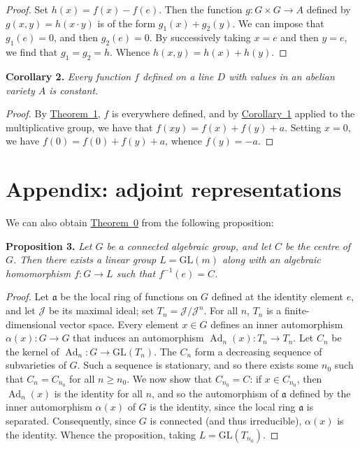 \documentclass{article}
\newenvironment{itenv}[1]
  {\phantomsection\par\medskip\noindent\textbf{#1.}\itshape}
  {\medskip}
\renewcommand{\geq}{\geqslant}
\newcommand{\scr}[1]{{\mathscr{#1}}}
\newcommand{\fk}[1]{{\mathfrak{#1}}}
\newcommand{\oldpage}[1]{\marginpar{\footnotesize$\Big\vert$ \textit{p.~#1}}}
\begin{document}
\begin{proof}
  Set $h(x)=f(x)-f(e)$.
  Then the function $g\colon G\times G\to A$ defined by $g(x,y)=h(x\cdot y)$ is of the form $g_1(x)+g_2(y)$.
  We can impose that $g_1(e)=0$, and then $g_2(e)=0$.
  By successively taking $x=e$ and then $y=e$, we find that $g_1=g_2=h$.
  Whence $h(x,y)=h(x)+h(y)$.
\end{proof}

\begin{itenv}{Corollary 2}
\label{corollary2}
  Every function $f$ defined on a line $D$ with values in an abelian variety $A$ is constant.
\end{itenv}

\oldpage{9-06}
\begin{proof}
  By \hyperref[theorem1]{Theorem~1}, $f$ is everywhere defined, and by \hyperref[corollary1]{Corollary~1} applied to the multiplicative group, we have that $f(xy)=f(x)+f(y)+a$.
  Setting $x=0$, we have $f(0)=f(0)+f(y)+a$, whence $f(y)=-a$.
\end{proof}


\section{Appendix: adjoint representations}
\label{appendix}

We can also obtain \hyperref[theorem0]{Theorem~0} from the following proposition:

\begin{itenv}{Proposition 3}
\label{proposition3}
  Let $G$ be a connected algebraic group, and let $C$ be the centre of $G$.
  Then there exists a linear group $L=\mathrm{GL}(m)$ along with an algebraic homomorphism $f\colon G\to L$ such that $f^{-1}(e)=C$.
\end{itenv}

\begin{proof}
  Let $\fk{a}$ be the local ring of functions on $G$ defined at the identity element $e$, and let $\scr{J}$ be its maximal ideal;
  set $T_n=\scr{J}/\scr{J}^n$.
  For all $n$, $T_n$ is a finite-dimensional vector space.
  Every element $x\in G$ defines an inner automorphism $\alpha(x)\colon G\to G$ that induces an automorphism $\operatorname{Ad}_n(x)\colon T_n\to T_n$.
  Let $C_n$ be the kernel of $\operatorname{Ad}_n\colon G\to\mathrm{GL}(T_n)$.
  The $C_n$ form a decreasing sequence of subvarieties of $G$.
  Such a sequence is stationary, and so there exists some $n_0$ such that $C_n=C_{n_0}$ for all $n\geq n_0$.
  We now show that $C_{n_0}=C$:
  if $x\in C_{n_0}$, then $\operatorname{Ad}_n(x)$ is the identity for all $n$, and so the automorphism of $\fk{a}$ defined by the inner automorphism $\alpha(x)$ of $G$ is the identity, since the local ring $\fk{a}$ is separated.
  Consequently, since $G$ is connected (and thus irreducible), $\alpha(x)$ is the identity.
  Whence the proposition, taking $L=\mathrm{GL}(T_{n_0})$.
\end{proof}
\end{document}
